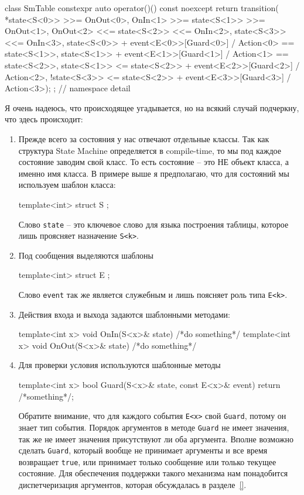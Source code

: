 \documentclass{article}
\begin{document}
{\begin{cppcode}
{class SmTable {
  constexpr auto operator()() const noexcept {
    return transition(
        *state<S<0>> >>= OnOut<0>,
        OnIn<1> >>= state<S<1>> >>= OnOut<1>,
        OnOut<2> <<= state<S<2>> <<= OnIn<2>,
        state<S<3>> <<= OnIn<3>,
        state<S<0>> + event<E<0>>[Guard<0>] / Action<0> == state<S<1>>,
        state<S<1>> + event<E<1>>[Guard<1>] / Action<1> == state<S<2>>,
        state<S<1>> <= state<S<2>> + event<E<2>>[Guard<2>] / Action<2>,
        !state<S<3>> <= state<S<2>> + event<E<3>>[Guard<3>] / Action<3>);
  }
};
} // namespace detail
\end{cppcode}
Я очень надеюсь, что происходящее угадывается, но на всякий случай подчеркну, что здесь происходит:
\begin{enumerate}
\item Прежде всего за состояния у нас отвечают отдельные классы.
Так как структура State Machine определяется в compile-time, то мы под каждое состояние заводим свой класс.
То есть состояние -- это НЕ объект класса, а именно имя класса.
В примере выше я предполагаю, что для состояний мы используем шаблон класса:
\begin{cppcode}[\nonumbers]
template<int>
struct S {};
\end{cppcode}
Слово \verb"state" -- это ключевое слово для языка построения таблицы, которое лишь проясняет назначение \verb"S<k>".

\item Под сообщения выделяются шаблоны
\begin{cppcode}[\nonumbers]
template<int>
struct E {};
\end{cppcode}
Слово \verb"event" так же является служебным и лишь поясняет роль типа \verb"E<k>".

\item Действия входа и выхода задаются шаблонными методами:
\begin{cppcode}[\nonumbers]
template<int x>
void OnIn(S<x>& state) {
  /*do something*/
}
template<int x>
void OnOut(S<x>& state) {
  /*do something*/
}
\end{cppcode}

\item Для проверки условия используются шаблонные методы
\begin{cppcode}[\nonumbers]
template<int x>
bool Guard(S<x>& state, const E<x>& event) {
  return /*something*/;
}
\end{cppcode}
Обратите внимание, что для каждого события \verb"E<x>" свой \verb"Guard", потому он знает тип события.
Порядок аргументов в методе \verb"Guard" не имеет значения, так же не имеет значения присутствуют ли оба аргумента.
Вполне возможно сделать \verb"Guard", который вообще не принимает аргументы и все время возвращает \verb"true", или принимает только сообщение или только текущее состояние.
Для обеспечения поддержки такого механизма нам понадобится диспетчеризация аргументов, которая обсуждалась в разделе~\ref{}.


\end{enumerate}}
\end{document}
